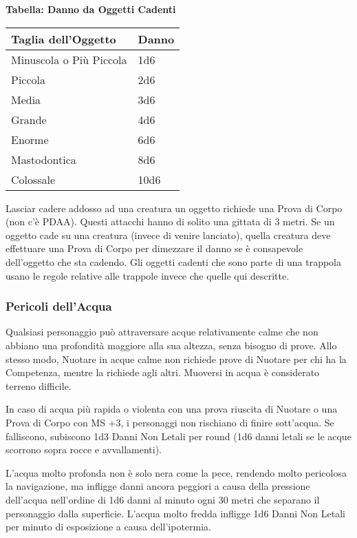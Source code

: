 \documentclass[12pt,a4paper,twoside,openany]{book}
\begin{document}
\begin{multicols}{2}
\bigskip

\textbf{Tabella: Danno da Oggetti Cadenti}

\medskip

\begin{tabular}{ll}
\textbf{Taglia dell'Oggetto} & \textbf{Danno}\\
\toprule
Minuscola o Più Piccola  & 1d6\\
Piccola  & 2d6\\
Media  & 3d6\\
Grande & 4d6\\
Enorme & 6d6\\
Mastodontica & 8d6\\
Colossale  & 10d6\\
\end{tabular}

\bigskip

Lasciar cadere addosso ad una creatura un oggetto richiede una Prova di Corpo (non c'è  PDAA). Questi attacchi hanno di solito una gittata di 3 metri. Se un oggetto cade su una creatura (invece di venire lanciato), quella creatura deve effettuare una Prova di Corpo per dimezzare il danno se è consapevole dell'oggetto che sta cadendo. Gli oggetti cadenti che sono parte di una trappola usano le regole relative alle trappole invece che quelle qui descritte.

\subsubsection{Pericoli dell'Acqua}

\label{pericoli-dellacqua}

Qualsiasi personaggio può attraversare acque relativamente calme che non abbiano una profondità maggiore alla sua altezza, senza bisogno di prove. Allo stesso modo, Nuotare in acque calme non richiede prove di Nuotare per chi ha la Competenza, mentre la richiede agli altri. Muoversi in acqua è considerato terreno difficile.

In caso di acqua più rapida o violenta con una prova riuscita di Nuotare o una Prova di Corpo con MS +3, i personaggi non rischiano di finire sott'acqua. Se falliscono, subiscono 1d3 Danni Non Letali per round (1d6 danni letali se le acque scorrono sopra rocce e avvallamenti).

L'acqua molto profonda non è solo nera come la pece, rendendo molto pericolosa la navigazione, ma infligge danni ancora peggiori a causa della pressione dell'acqua nell'ordine di 1d6 danni al minuto ogni 30 metri che separano il personaggio dalla superficie. L'acqua molto fredda infligge 1d6 Danni Non Letali per minuto di esposizione a causa dell'ipotermia.


\end{multicols}
\end{document}
